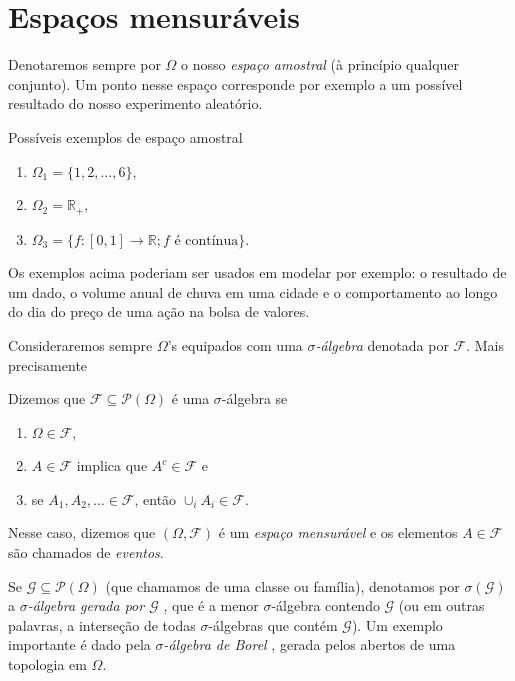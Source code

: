 \documentclass[../main/Notas_de_aula.tex]{subfiles}
\begin{document}
\section{Espaços mensuráveis}

Denotaremos sempre por $\Omega$ o nosso \emph{espaço amostral}  (à princípio qualquer conjunto).
Um ponto nesse espaço corresponde por exemplo a um possível resultado do nosso experimento aleatório.

\begin{example} Possíveis exemplos de espaço amostral
  \label{x:espacos_amostrais}
  \begin{enumerate}[\quad a)]
  \item $\Omega_1 = \{1, 2, \dots, 6\}$,
  \item $\Omega_2 = \mathbb{R}_+$,
  \item $\Omega_3 = \{f:[0,1] \to \mathbb{R}; \text{$f$ é contínua}\}$.
  \end{enumerate}
\end{example}
Os exemplos acima poderiam ser usados em modelar por exemplo: o resultado de um dado, o volume anual de chuva em uma cidade e o comportamento ao longo do dia do preço de uma ação na bolsa de valores.

Consideraremos sempre $\Omega$'s equipados com uma \emph{$\sigma$-álgebra}  denotada por $\mathcal{F}$.
Mais precisamente
\begin{definition}
  Dizemos que $\mathcal{F} \subseteq \mathcal{P}(\Omega)$ é uma $\sigma$-álgebra se
  \begin{enumerate}[\quad a)]
  \item $\Omega \in \mathcal{F}$,
  \item $A \in \mathcal{F}$ implica que $A^c \in \mathcal{F}$ e
  \item se $A_1, A_2, \dots \in \mathcal{F}$, então $\cup_i A_i \in \mathcal{F}$.
  \end{enumerate}
\end{definition}
Nesse caso, dizemos que $(\Omega, \mathcal{F})$ é um \emph{espaço mensurável}
 e os elementos $A \in \mathcal{F}$ são chamados de \emph{eventos}. 

Se $\mathcal{G} \subseteq \mathcal{P}(\Omega)$ (que chamamos de uma classe ou família), denotamos por $\sigma(\mathcal{G})$ a
\emph{$\sigma$-álgebra gerada por $\mathcal{G}$} , que é a menor $\sigma$-álgebra
contendo $\mathcal{G}$ (ou em outras palavras, a interseção de todas $\sigma$-álgebras que contém $\mathcal{G}$).
Um exemplo importante é dado pela \emph{$\sigma$-álgebra de Borel} , gerada pelos abertos de uma topologia em $\Omega$.
\end{document}
